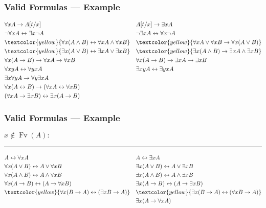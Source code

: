 \documentclass[UTF8,11pt,colorlinks,compress,openany]{beamer}%
\begin{document}
\begin{frame}\frametitle{Valid Formulas --- Example}
	\begin{align*}
	&\forall x A\to A[t/x] && A[t/x]\to\exists x A\\
	&\neg\forall x A\leftrightarrow\exists x\neg A &&\neg\exists x A\leftrightarrow\forall x\neg A\\
	&\textcolor{yellow}{\forall x(A\wedge B)\leftrightarrow\forall x A\wedge\forall x B} &&\textcolor{yellow}{\forall x A\vee\forall x B\to\forall x(A\vee B)}\\
	&\textcolor{yellow}{\exists x(A\vee B)\leftrightarrow\exists x A\vee\exists x B} &&\textcolor{yellow}{\exists x(A\wedge B)\to\exists x A\wedge\exists x B}\\
	&\forall x(A\to B)\to\forall x A\to\forall x B &&\forall x(A\to B)\to\exists x A\to\exists x B\\
	&\forall xy A\leftrightarrow\forall yx A &&\exists xy A\leftrightarrow\exists yx A\\
	&\exists x\forall y A\to\forall y\exists x A &&\\
	&\forall x(A\leftrightarrow B)\to(\forall x A\leftrightarrow\forall x B) &&\\
	&(\forall x A\to\exists x B)\leftrightarrow\exists x(A\to B)&&
	\end{align*}
\end{frame}

\begin{frame}\frametitle{Valid Formulas --- Example}
	$x\notin \operatorname{Fv}(A):$
	\hrule
	\begin{align*}
	& A\leftrightarrow\forall x A && A\leftrightarrow\exists x A\\
	&\forall x(A\vee B)\leftrightarrow A\vee\forall x B &&\exists x(A\vee B)\leftrightarrow A\vee\exists x B\\
	&\forall x(A\wedge B)\leftrightarrow A\wedge\forall x B &&\exists x(A\wedge B)\leftrightarrow A\wedge\exists x B\\
	&\forall x(A\to B)\leftrightarrow(A\to\forall x B) &&\exists x(A\to B)\leftrightarrow(A\to\exists x B)\\
	&\textcolor{yellow}{\forall x(B\to A)\leftrightarrow(\exists x B\to A)} &&\textcolor{yellow}{\exists x(B\to A)\leftrightarrow(\forall x B\to A)}\\
	&&&\exists x(A\to\forall x A)
	\end{align*}
\end{frame}
\end{document}
